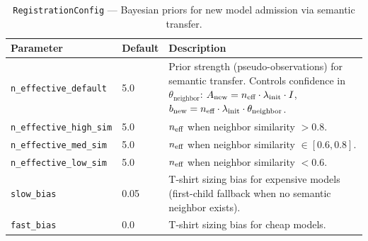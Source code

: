 
\begin{table}[h]
\centering
\caption{\texttt{RegistrationConfig} --- Bayesian priors for new model admission via semantic transfer.}
\label{tab:registration_library}
\small
\begin{tabular}{@{}llp{6.5cm}@{}}
\toprule
\textbf{Parameter} & \textbf{Default} & \textbf{Description} \\
\midrule
\texttt{n\_effective\_default} & 5.0 & Prior strength (pseudo-observations) for semantic transfer. Controls confidence in $\theta_{\text{neighbor}}$: $A_{\text{new}} = n_{\text{eff}} \cdot \lambda_{\text{init}} \cdot I$,\; $b_{\text{new}} = n_{\text{eff}} \cdot \lambda_{\text{init}} \cdot \theta_{\text{neighbor}}$. \\
\texttt{n\_effective\_high\_sim} & 5.0 & $n_{\text{eff}}$ when neighbor similarity $> 0.8$. \\
\texttt{n\_effective\_med\_sim} & 5.0 & $n_{\text{eff}}$ when neighbor similarity $\in [0.6, 0.8]$. \\
\texttt{n\_effective\_low\_sim} & 5.0 & $n_{\text{eff}}$ when neighbor similarity $< 0.6$. \\
\texttt{slow\_bias} & 0.05 & T-shirt sizing bias for expensive models (first-child fallback when no semantic neighbor exists). \\
\texttt{fast\_bias} & 0.0 & T-shirt sizing bias for cheap models. \\
\bottomrule
\end{tabular}
\end{table}

